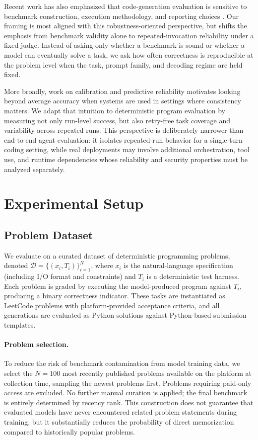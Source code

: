 \documentclass[11pt]{article}
\begin{document}
Recent work has also emphasized that code-generation evaluation is sensitive to benchmark construction, execution methodology, and reporting choices \cite{liu2024your,du2024evaluating}. Our framing is most aligned with this robustness-oriented perspective, but shifts the emphasis from benchmark validity alone to repeated-invocation reliability under a fixed judge. Instead of asking only whether a benchmark is sound or whether a model can eventually solve a task, we ask how often correctness is reproducible at the problem level when the task, prompt family, and decoding regime are held fixed.

More broadly, work on calibration and predictive reliability \cite{guo2017calibration} motivates looking beyond average accuracy when systems are used in settings where consistency matters. We adapt that intuition to deterministic program evaluation by measuring not only run-level success, but also retry-free task coverage and variability across repeated runs. This perspective is deliberately narrower than end-to-end agent evaluation: it isolates repeated-run behavior for a single-turn coding setting, while real deployments may involve additional orchestration, tool use, and runtime dependencies whose reliability and security properties must be analyzed separately.

\section{Experimental Setup}

\subsection{Problem Dataset}
We evaluate on a curated dataset of deterministic programming problems, denoted $\mathcal{D}=\{(x_i, T_i)\}_{i=1}^{N}$, where $x_i$ is the natural-language specification (including I/O format and constraints) and $T_i$ is a deterministic test harness. Each problem is graded by executing the model-produced program against $T_i$, producing a binary correctness indicator. These tasks are instantiated as LeetCode problems with platform-provided acceptance criteria, and all generations are evaluated as Python solutions against Python-based submission templates.

\paragraph{Problem selection.} To reduce the risk of benchmark contamination from model training data, we select the $N=100$ most recently published problems available on the platform at collection time, sampling the newest problems first. Problems requiring paid-only access are excluded. No further manual curation is applied; the final benchmark is entirely determined by recency rank. This construction does not guarantee that evaluated models have never encountered related problem statements during training, but it substantially reduces the probability of direct memorization compared to historically popular problems.
\end{document}
